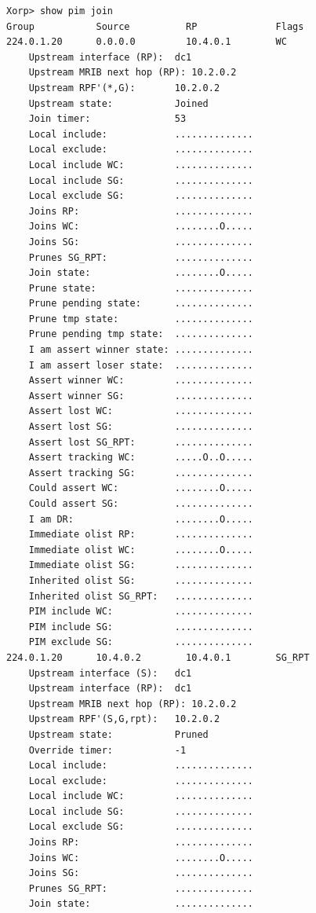 \documentclass[11pt]{report}
\begin{document}
\begin{itemize}
\begin{verbatim}
Xorp> show pim join 
Group           Source          RP              Flags
224.0.1.20      0.0.0.0         10.4.0.1        WC   
    Upstream interface (RP):  dc1
    Upstream MRIB next hop (RP): 10.2.0.2
    Upstream RPF'(*,G):       10.2.0.2
    Upstream state:           Joined 
    Join timer:               53
    Local include:            ..............
    Local exclude:            ..............
    Local include WC:         ..............
    Local include SG:         ..............
    Local exclude SG:         ..............
    Joins RP:                 ..............
    Joins WC:                 ........O.....
    Joins SG:                 ..............
    Prunes SG_RPT:            ..............
    Join state:               ........O.....
    Prune state:              ..............
    Prune pending state:      ..............
    Prune tmp state:          ..............
    Prune pending tmp state:  ..............
    I am assert winner state: ..............
    I am assert loser state:  ..............
    Assert winner WC:         ..............
    Assert winner SG:         ..............
    Assert lost WC:           ..............
    Assert lost SG:           ..............
    Assert lost SG_RPT:       ..............
    Assert tracking WC:       .....O..O.....
    Assert tracking SG:       ..............
    Could assert WC:          ........O.....
    Could assert SG:          ..............
    I am DR:                  ........O.....
    Immediate olist RP:       ..............
    Immediate olist WC:       ........O.....
    Immediate olist SG:       ..............
    Inherited olist SG:       ..............
    Inherited olist SG_RPT:   ..............
    PIM include WC:           ..............
    PIM include SG:           ..............
    PIM exclude SG:           ..............
224.0.1.20      10.4.0.2        10.4.0.1        SG_RPT 
    Upstream interface (S):   dc1
    Upstream interface (RP):  dc1
    Upstream MRIB next hop (RP): 10.2.0.2
    Upstream RPF'(S,G,rpt):   10.2.0.2
    Upstream state:           Pruned 
    Override timer:           -1
    Local include:            ..............
    Local exclude:            ..............
    Local include WC:         ..............
    Local include SG:         ..............
    Local exclude SG:         ..............
    Joins RP:                 ..............
    Joins WC:                 ........O.....
    Joins SG:                 ..............
    Prunes SG_RPT:            ..............
    Join state:               ..............

\end{verbatim}
\end{itemize}
\end{document}
